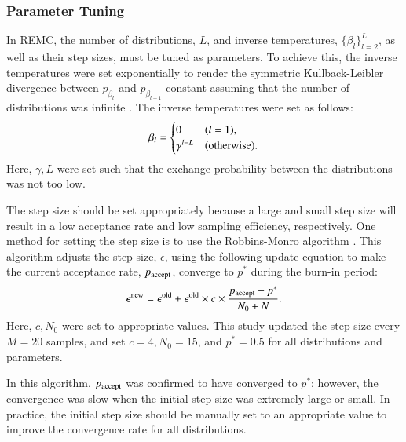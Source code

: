 \documentclass[12pt]{article}
\begin{document}
\subsubsection{Parameter Tuning}
In REMC, the number of distributions, $L$, and inverse temperatures, $\{\beta_l\}_{l=2}^L$, as well as their step sizes, must be tuned as parameters.
To achieve this, the inverse temperatures were set exponentially to render the symmetric Kullback-Leibler divergence between $p_{\beta_l}$ and $p_{\beta_{l-1}}$ constant assuming that the number of distributions was infinite \cite{nagata2008asymptotic}.
The inverse temperatures were set as follows:
\begin{align}
  \beta_l = \begin{cases}
      0 & (l = 1), \\
      \gamma^{l - L} & (\textup{otherwise}).
  \end{cases}    
  \label{eq:temperature_setting}
\end{align}
Here, $\gamma, L$ were set such that the exchange probability between the distributions was not too low. \par
The step size should be set appropriately because a large and small step size will result in a low acceptance rate and low sampling efficiency, respectively.
One method for setting the step size is to use the Robbins-Monro algorithm \cite{robbins1951stochastic, garthwaite2016adaptive}.
This algorithm adjusts the step size, $\epsilon$, using the following update equation to make the current acceptance rate, $p_{\textup{accept}}$, converge to $p^*$ during the burn-in period:
\begin{align}
  \epsilon^{\textup{new}} = \epsilon^{\textup{old}} + \epsilon^{\textup{old}} \times c \times \frac{p_{\textup{accept}} - p^*}{N_0 + N}.
\end{align}
Here, $c, N_0$ were set to appropriate values. This study updated the step size every $M = 20$ samples, and set $c = 4, N_0 = 15$, and $p^* = 0.5$ for all distributions and parameters. \par
In this algorithm, $p_{\textup{accept}}$ was confirmed to have converged to $p^*$; however, the convergence was slow when the initial step size was extremely large or small.
In practice, the initial step size should be manually set to an appropriate value to improve the convergence rate for all distributions. \par
\end{document}
